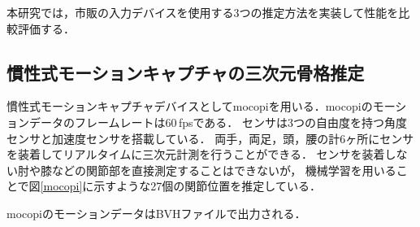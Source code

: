 \documentclass[titlepage]{jarticle}
\begin{document}
本研究では，市販の入力デバイスを使用する3つの推定方法を実装して性能を比較評価する．%
\subsection{慣性式モーションキャプチャの三次元骨格推定}\label{motion}
慣性式モーションキャプチャデバイスとしてmocopiを用いる．mocopiのモーションデータのフレームレートは60\,fpsである．
センサは3つの自由度を持つ角度センサと加速度センサを搭載している．
両手，両足，頭，腰の計6ヶ所にセンサを装着してリアルタイムに三次元計測を行うことができる．
センサを装着しない肘や膝などの関節部を直接測定することはできないが，
機械学習を用いることで図\ref{mocopi}に示すような27個の関節位置を推定している．

mocopiのモーションデータはBVHファイルで出力される．
\end{document}
